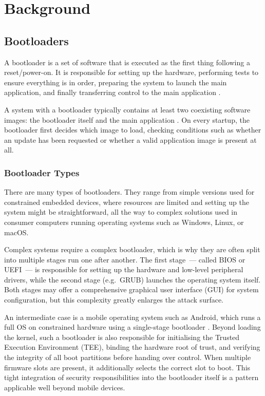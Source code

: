 \chapter{Background}
\label{chapter:bg}

\section{Bootloaders}
\label{section:bg-bootloader}

A bootloader is a set of software that is executed as the first thing following a reset/power-on. It is responsible for setting up the hardware, performing tests to ensure everything is in order, preparing the system to launch the main application, and finally transferring control to the main application \cite{lohr_patterns_2010, beningo_2015, SAVOIR, wolfBoot}.

A system with a bootloader typically contains at least two coexisting software images: the bootloader itself and the main application \cite{beningo_2015, SAVOIR, wolfBoot}. On every startup, the bootloader first decides which image to load, checking conditions such as whether an update has been requested or whether a valid application image is present at all.

\subsection{Bootloader Types}
\label{subsection:bg-bootloader-types}

There are many types of bootloaders. They range from simple versions used for constrained embedded devices, where resources are limited and setting up the system might be straightforward, all the way to complex solutions used in consumer computers running operating systems such as Windows, Linux, or macOS. 

Complex systems require a complex bootloader, which is why they are often split into multiple stages run one after another. The first stage~--- called BIOS or UEFI~--- is responsible for setting up the hardware and low-level peripheral drivers, while the second stage (e.g.\ GRUB) launches the operating system itself. Both stages may offer a comprehensive graphical user interface (GUI) for system configuration, but this complexity greatly enlarges the attack surface.

An intermediate case is a mobile operating system such as Android, which runs a full OS on constrained hardware using a single-stage bootloader \cite{android_bootloader_2026}. Beyond loading the kernel, such a bootloader is also responsible for initialising the Trusted Execution Environment (TEE), binding the hardware root of trust, and verifying the integrity of all boot partitions before handing over control. When multiple firmware slots are present, it additionally selects the correct slot to boot. This tight integration of security responsibilities into the bootloader itself is a pattern applicable well beyond mobile devices.

